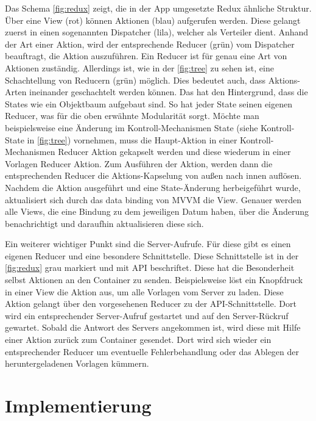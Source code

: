 \documentclass[notables, nomenclature, oneside, 150]{HSMW-Thesis}
\begin{document}
		Das Schema \ref{fig:redux} zeigt, die in der App umgesetzte Redux ähnliche Struktur. Über eine View (rot) können Aktionen (blau) aufgerufen werden. Diese gelangt zuerst in einen sogenannten Dispatcher (lila), welcher als Verteiler dient. Anhand der Art einer Aktion, wird der entsprechende Reducer (grün) vom Dispatcher beauftragt, die Aktion auszuführen. Ein Reducer ist für genau eine Art von Aktionen zuständig. Allerdings ist, wie in der \autoref{fig:tree} zu sehen ist, eine Schachtellung von Reducern (grün) möglich. Dies bedeutet auch, dass Aktions-Arten ineinander geschachtelt werden können. Das hat den Hintergrund, dass die States wie ein Objektbaum aufgebaut sind. So hat jeder State seinen eigenen Reducer, was für die oben erwähnte Modularität sorgt. Möchte man beispielsweise eine Änderung im Kontroll-Mechanismen State (siehe Kontroll-State in \ref{fig:tree}) vornehmen, muss die Haupt-Aktion in einer Kontroll-Mechanismen Reducer Aktion gekapselt werden und diese wiederum in einer Vorlagen Reducer Aktion. Zum Ausführen der Aktion, werden dann die entsprechenden Reducer die Aktions-Kapselung von außen nach innen auflösen. Nachdem die Aktion ausgeführt und eine State-Änderung herbeigeführt wurde, aktualisiert sich durch das data binding von MVVM die View. Genauer werden alle Views, die eine Bindung zu dem jeweiligen Datum haben, über die Änderung benachrichtigt und daraufhin aktualisieren diese sich.

		Ein weiterer wichtiger Punkt sind die Server-Aufrufe. Für diese gibt es einen eigenen Reducer und eine besondere Schnittstelle. Diese Schnittstelle ist in der \autoref{fig:redux} grau markiert und mit API  beschriftet. Diese hat die Besonderheit selbst Aktionen an den Container zu senden. Beispielsweise löst ein Knopfdruck in einer View die Aktion aus, um alle Vorlagen vom Server zu laden. Diese Aktion gelangt über den vorgesehenen Reducer zu der API-Schnittstelle. Dort wird ein entsprechender Server-Aufruf gestartet und auf den Server-Rückruf gewartet. Sobald die Antwort des Servers angekommen ist, wird diese mit Hilfe einer Aktion zurück zum Container gesendet. Dort wird sich wieder ein entsprechender Reducer um eventuelle Fehlerbehandlung oder das Ablegen der heruntergeladenen Vorlagen kümmern.
		
	\section{Implementierung}\label{sc:implementierung}
		
\end{document}
